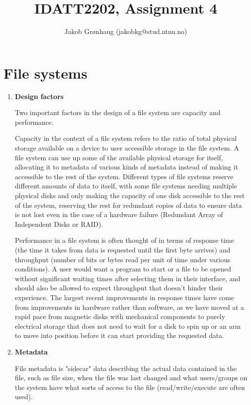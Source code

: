 \documentclass{article}
\title{IDATT2202, Assignment 4}
\author{Jakob Grønhaug (jakobkg@stud.ntnu.no)}
\begin{document}
\maketitle

\section{File systems}

\begin{enumerate}
    \item \textbf{Design factors}

          Two important factors in the design of a file system are capacity and performance.

          Capacity in the context of a file system refers to the ratio of total physical storage available on a device to user accessible storage in the file system. A file system can use up some of the available physical storage for itself, allocating it to metadata of various kinds of metadata instead of making it accessible to the rest of the system. Different types of file systems reserve different amounts of data to itself, with some file systems needing multiple physical disks and only making the capacity of one disk accessible to the rest of the system, reserving the rest for redundant copies of data to ensure data is not lost even in the case of a hardware failure (Redundant Array of Independent Disks or RAID).

          Performance in a file system is often thought of in terms of response time (the time it takes from data is requested until the first byte arrives) and throughput (number of bits or bytes read per unit of time under various conditions). A user would want a program to start or a file to be opened without significant waiting times after selecting them in their interface, and should also be allowed to expect throughput that doesn't hinder their experience. The largest recent improvements in response times have come from improvements in hardware rather than software, as we have moved at a rapid pace from magnetic disks with mechanical components to purely electrical storage that does not need to wait for a disk to spin up or an arm to move into position before it can start providing the requested data.

    \item \textbf{Metadata}

          File metadata is "sidecar" data describing the actual data contained in the file, such as file size, when the file was last changed and what users/groups on the system have what sorts of access to the file (read/write/execute are often used).
\end{enumerate}
\end{document}
